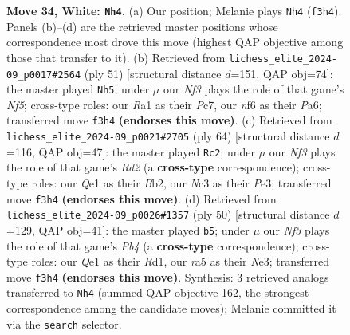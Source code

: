 \documentclass[11pt]{article}
\begin{document}
\begin{figure}[p]
\caption{\textbf{Move 34, White: \texttt{Nh4}.} (a) Our position; Melanie plays \texttt{Nh4} (\texttt{f3h4}). Panels (b)--(d) are the retrieved master positions whose correspondence most drove this move (highest QAP objective among those that transfer to it). (b) Retrieved from \texttt{lichess\_elite\_2024-09\_p0017\#2564} (ply 51) [structural distance $d$=151, QAP obj=74]: the master played \texttt{Nh5}; under $\mu$ our \emph{Nf3} plays the role of that game's \emph{Nf5}; cross-type roles: our \emph{R}a1 as their \emph{P}c7, our \emph{n}f6 as their \emph{P}a6; transferred move \texttt{f3h4} \textbf{(endorses this move)}. (c) Retrieved from \texttt{lichess\_elite\_2024-09\_p0021\#2705} (ply 64) [structural distance $d$=116, QAP obj=47]: the master played \texttt{Rc2}; under $\mu$ our \emph{Nf3} plays the role of that game's \emph{Rd2} (a \textbf{cross-type} correspondence); cross-type roles: our \emph{Q}e1 as their \emph{B}b2, our \emph{N}c3 as their \emph{P}e3; transferred move \texttt{f3h4} \textbf{(endorses this move)}. (d) Retrieved from \texttt{lichess\_elite\_2024-09\_p0026\#1357} (ply 50) [structural distance $d$=129, QAP obj=41]: the master played \texttt{b5}; under $\mu$ our \emph{Nf3} plays the role of that game's \emph{Pb4} (a \textbf{cross-type} correspondence); cross-type roles: our \emph{Q}e1 as their \emph{R}d1, our \emph{r}a5 as their \emph{N}e3; transferred move \texttt{f3h4} \textbf{(endorses this move)}. Synthesis: 3 retrieved analogs transferred to \texttt{Nh4} (summed QAP objective 162, the strongest correspondence among the candidate moves); Melanie committed it via the \texttt{search} selector.}
\label{fig:thought-m66}
\end{figure}

\clearpage
\end{document}
